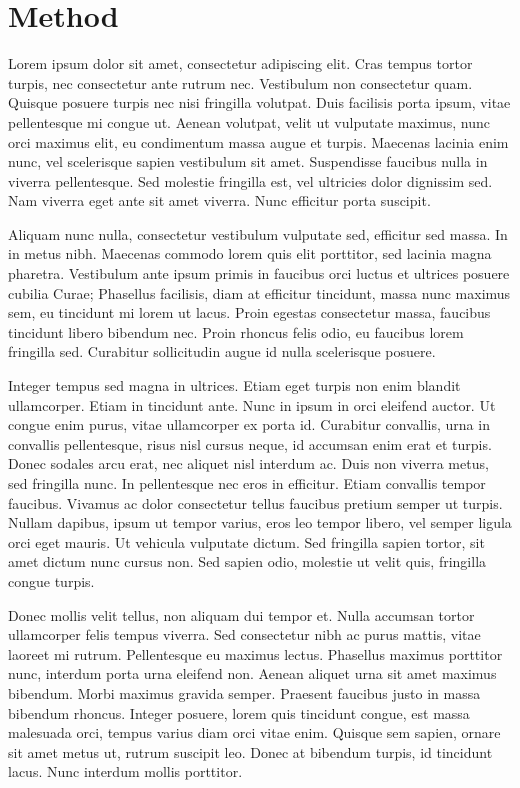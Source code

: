 \section{Method}
Lorem ipsum dolor sit amet, consectetur adipiscing elit. Cras tempus tortor turpis, nec consectetur ante rutrum nec. Vestibulum non consectetur quam. Quisque posuere turpis nec nisi fringilla volutpat. Duis facilisis porta ipsum, vitae pellentesque mi congue ut. Aenean volutpat, velit ut vulputate maximus, nunc orci maximus elit, eu condimentum massa augue et turpis. Maecenas lacinia enim nunc, vel scelerisque sapien vestibulum sit amet. Suspendisse faucibus nulla in viverra pellentesque. Sed molestie fringilla est, vel ultricies dolor dignissim sed. Nam viverra eget ante sit amet viverra. Nunc efficitur porta suscipit.

Aliquam nunc nulla, consectetur vestibulum vulputate sed, efficitur sed massa. In in metus nibh. Maecenas commodo lorem quis elit porttitor, sed lacinia magna pharetra. Vestibulum ante ipsum primis in faucibus orci luctus et ultrices posuere cubilia Curae; Phasellus facilisis, diam at efficitur tincidunt, massa nunc maximus sem, eu tincidunt mi lorem ut lacus. Proin egestas consectetur massa, faucibus tincidunt libero bibendum nec. Proin rhoncus felis odio, eu faucibus lorem fringilla sed. Curabitur sollicitudin augue id nulla scelerisque posuere.

Integer tempus sed magna in ultrices. Etiam eget turpis non enim blandit ullamcorper. Etiam in tincidunt ante. Nunc in ipsum in orci eleifend auctor. Ut congue enim purus, vitae ullamcorper ex porta id. Curabitur convallis, urna in convallis pellentesque, risus nisl cursus neque, id accumsan enim erat et turpis. Donec sodales arcu erat, nec aliquet nisl interdum ac. Duis non viverra metus, sed fringilla nunc. In pellentesque nec eros in efficitur. Etiam convallis tempor faucibus. Vivamus ac dolor consectetur tellus faucibus pretium semper ut turpis. Nullam dapibus, ipsum ut tempor varius, eros leo tempor libero, vel semper ligula orci eget mauris. Ut vehicula vulputate dictum. Sed fringilla sapien tortor, sit amet dictum nunc cursus non. Sed sapien odio, molestie ut velit quis, fringilla congue turpis.

Donec mollis velit tellus, non aliquam dui tempor et. Nulla accumsan tortor ullamcorper felis tempus viverra. Sed consectetur nibh ac purus mattis, vitae laoreet mi rutrum. Pellentesque eu maximus lectus. Phasellus maximus porttitor nunc, interdum porta urna eleifend non. Aenean aliquet urna sit amet maximus bibendum. Morbi maximus gravida semper. Praesent faucibus justo in massa bibendum rhoncus. Integer posuere, lorem quis tincidunt congue, est massa malesuada orci, tempus varius diam orci vitae enim. Quisque sem sapien, ornare sit amet metus ut, rutrum suscipit leo. Donec at bibendum turpis, id tincidunt lacus. Nunc interdum mollis porttitor.

